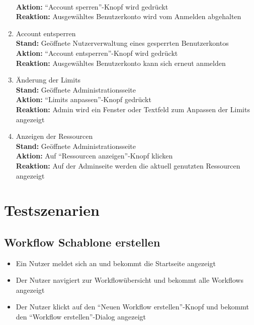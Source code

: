 \begin{enumerate}
        \\ \textbf{Aktion:} \enquote{Account sperren}-Knopf wird gedrückt
        \\ \textbf{Reaktion:} Ausgewähltes Benutzerkonto wird vom Anmelden abgehalten
    \item Account entsperren
        \\ \textbf{Stand:} Geöffnete Nutzerverwaltung eines gesperrten Benutzerkontos
        \\ \textbf{Aktion:} \enquote{Account entsperren}-Knopf wird gedrückt
        \\ \textbf{Reaktion:} Ausgewähltes Benutzerkonto kann sich erneut anmelden
    \item Änderung der Limits
        \\ \textbf{Stand:} Geöffnete Administrationsseite
        \\ \textbf{Aktion:} \enquote{Limits anpassen}-Knopf gedrückt
        \\ \textbf{Reaktion:} \gls{Admin} wird ein Fenster oder Textfeld zum Anpassen der Limits angezeigt
    \item Anzeigen der Ressourcen
        \\ \textbf{Stand:} Geöffnete Administrationsseite
        \\ \textbf{Aktion:} Auf \enquote{Ressourcen anzeigen}-Knopf klicken
        \\ \textbf{Reaktion:} Auf der Adminseite werden die aktuell genutzten Ressourcen angezeigt
\end{enumerate}


\section{Testszenarien}

\subsection*{\gls{Workflow Schablone} erstellen}
\begin{itemize}
    \item Ein \Gls{Nutzer} meldet sich an und bekommt die Startseite angezeigt
    \item Der \Gls{Nutzer} navigiert zur Workflowübersicht und bekommt alle Workflows angezeigt
    \item Der \gls{Nutzer} klickt auf den \enquote{Neuen Workflow erstellen}-Knopf und bekommt den \enquote{Workflow erstellen}-Dialog angezeigt
\end{itemize}

